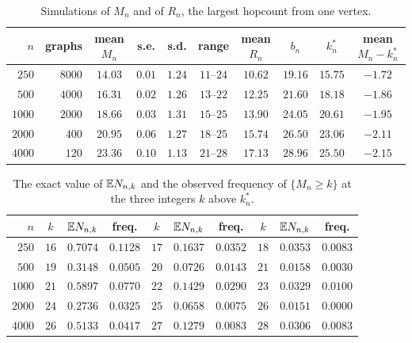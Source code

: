 \begin{table}[ht]
\centering
\small
\begin{tabular}{rrcccccccc}
\hline
$n$ & graphs & mean $M_n$ & s.e. & s.d. & range & mean $R_n$ & $b_n$ & $k^*_n$ & mean $M_n-k^*_n$ \\
\hline
$250$ & $8000$ & $14.03$ & $0.01$ & $1.24$ & $11$--$24$ & $10.62$ & $19.16$ & $15.75$ & $-1.72$ \\
$500$ & $4000$ & $16.31$ & $0.02$ & $1.26$ & $13$--$22$ & $12.25$ & $21.60$ & $18.18$ & $-1.86$ \\
$1000$ & $2000$ & $18.66$ & $0.03$ & $1.31$ & $15$--$25$ & $13.90$ & $24.05$ & $20.61$ & $-1.95$ \\
$2000$ & $400$ & $20.95$ & $0.06$ & $1.27$ & $18$--$25$ & $15.74$ & $26.50$ & $23.06$ & $-2.11$ \\
$4000$ & $120$ & $23.36$ & $0.10$ & $1.13$ & $21$--$28$ & $17.13$ & $28.96$ & $25.50$ & $-2.15$ \\
\hline
\end{tabular}
\caption{Simulations of $M_n$ and of $R_n$, the largest hopcount from one vertex.}\label{tab:sim}
\end{table}

\begin{table}[ht]
\centering
\small
\begin{tabular}{rccccccccc}
\hline
$n$ & $k$ & $\mathbb{E} N_{n,k}$ & freq. & $k$ & $\mathbb{E} N_{n,k}$ & freq. & $k$ & $\mathbb{E} N_{n,k}$ & freq. \\
\hline
$250$ & $16$ & $0.7074$ & $0.1128$ & $17$ & $0.1637$ & $0.0352$ & $18$ & $0.0353$ & $0.0083$ \\
$500$ & $19$ & $0.3148$ & $0.0505$ & $20$ & $0.0726$ & $0.0143$ & $21$ & $0.0158$ & $0.0030$ \\
$1000$ & $21$ & $0.5897$ & $0.0770$ & $22$ & $0.1429$ & $0.0290$ & $23$ & $0.0329$ & $0.0100$ \\
$2000$ & $24$ & $0.2736$ & $0.0325$ & $25$ & $0.0658$ & $0.0075$ & $26$ & $0.0151$ & $0.0000$ \\
$4000$ & $26$ & $0.5133$ & $0.0417$ & $27$ & $0.1279$ & $0.0083$ & $28$ & $0.0306$ & $0.0083$ \\
\hline
\end{tabular}
\caption{The exact value of $\mathbb{E} N_{n,k}$ and the observed frequency of $\{M_n\ge k\}$ at the three integers $k$
above $k^*_n$.}\label{tab:freq}
\end{table}


